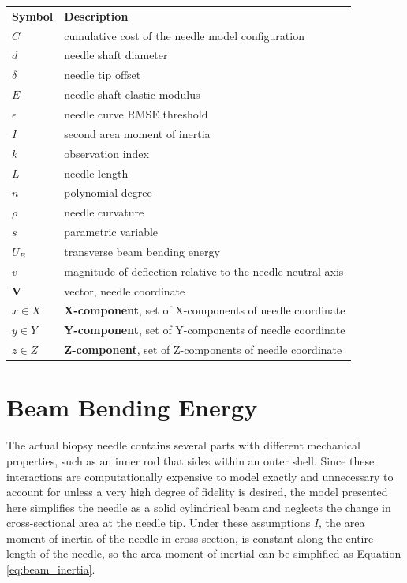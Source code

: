 \begin{tabular}{@{}ll@{}} 
\textbf{Symbol} & \textbf{Description} \\
$C$ & cumulative cost of the needle model configuration \\
$d$ & needle shaft diameter \\
$\delta$ & needle tip offset \\
$E$ & needle shaft elastic modulus \\
$\epsilon$ & needle curve RMSE threshold \\
$I$ & second area moment of inertia \\
$k$ & observation index \\
$L$ & needle length \\
$n$ & polynomial degree \\
$\rho$ & needle curvature \\
$s$ & parametric variable \\
$U_B$ & transverse beam bending energy \\
$v $ & magnitude of deflection relative to the needle neutral axis \\
$\textbf{V}$ & vector, needle coordinate \\
$x \in X$ & \textbf{X-component}, set of X-components of needle coordinate \\
$y \in Y$ & \textbf{Y-component}, set of Y-components of needle coordinate \\
$z \in Z$ & \textbf{Z-component}, set of Z-components of needle coordinate \\

\end{tabular}

\section{Beam Bending Energy}
The actual biopsy needle contains several parts with different mechanical properties, such as an inner rod that sides within an outer shell. Since these interactions are computationally expensive to model exactly and unnecessary to account for unless a very high degree of fidelity is desired, the model presented here simplifies the needle as a solid cylindrical beam and neglects the change in cross-sectional area at the needle tip. Under these assumptions $I$, the area moment of inertia of the needle in cross-section, is constant along the entire length of the needle, so the area moment of inertial can be simplified as Equation \ref{eq:beam_inertia}. 

